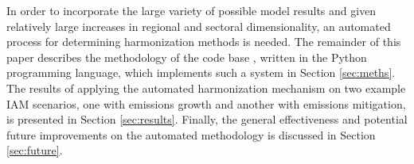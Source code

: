 In order to incorporate the large variety of possible model results and given
% 
% 
relatively large increases in regional and sectoral dimensionality, an automated
process for determining harmonization methods is needed. The remainder of this
% 
% 
% 
paper describes the methodology of the  code base ,
written in the Python programming language, which implements such a system in
Section \ref{sec:meths}. The results of applying the automated harmonization
mechanism on two example IAM scenarios, one with emissions growth and another
with emissions mitigation, is presented in Section \ref{sec:results}. Finally,
the general effectiveness and potential future improvements on the automated
methodology is discussed in Section \ref{sec:future}.

